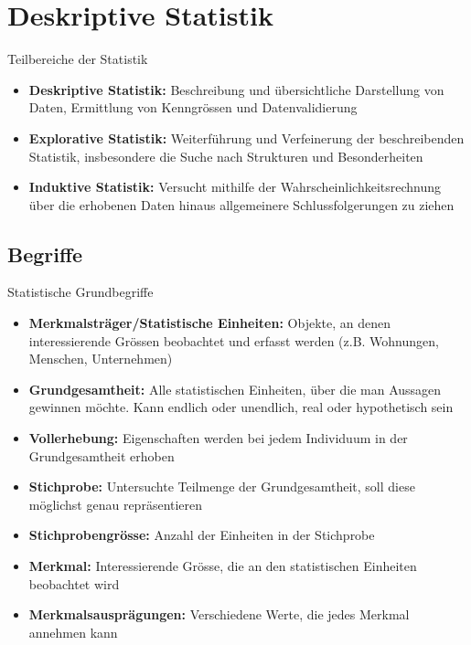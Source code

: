 \section{Deskriptive Statistik}

\begin{concept}{Teilbereiche der Statistik}
\begin{itemize}
    \item \textbf{Deskriptive Statistik:} Beschreibung und übersichtliche Darstellung von Daten, Ermittlung von Kenngrössen und Datenvalidierung
    \item \textbf{Explorative Statistik:} Weiterführung und Verfeinerung der beschreibenden Statistik, insbesondere die Suche nach Strukturen und Besonderheiten
    \item \textbf{Induktive Statistik:} Versucht mithilfe der Wahrscheinlichkeitsrechnung über die erhobenen Daten hinaus allgemeinere Schlussfolgerungen zu ziehen
\end{itemize}
\end{concept} 

\subsection{Begriffe}

\begin{definition}{Statistische Grundbegriffe}
\begin{itemize}
    \item \textbf{Merkmalsträger/Statistische Einheiten:} Objekte, an denen interessierende Grössen beobachtet und erfasst werden (z.B. Wohnungen, Menschen, Unternehmen)
    \item \textbf{Grundgesamtheit:} Alle statistischen Einheiten, über die man Aussagen gewinnen möchte. Kann endlich oder unendlich, real oder hypothetisch sein
    \item \textbf{Vollerhebung:} Eigenschaften werden bei jedem Individuum in der Grundgesamtheit erhoben
    \item \textbf{Stichprobe:} Untersuchte Teilmenge der Grundgesamtheit, soll diese möglichst genau repräsentieren
    \item \textbf{Stichprobengrösse:} Anzahl der Einheiten in der Stichprobe
    \item \textbf{Merkmal:} Interessierende Grösse, die an den statistischen Einheiten beobachtet wird
    \item \textbf{Merkmalsausprägungen:} Verschiedene Werte, die jedes Merkmal annehmen kann
\end{itemize}
\end{definition}

